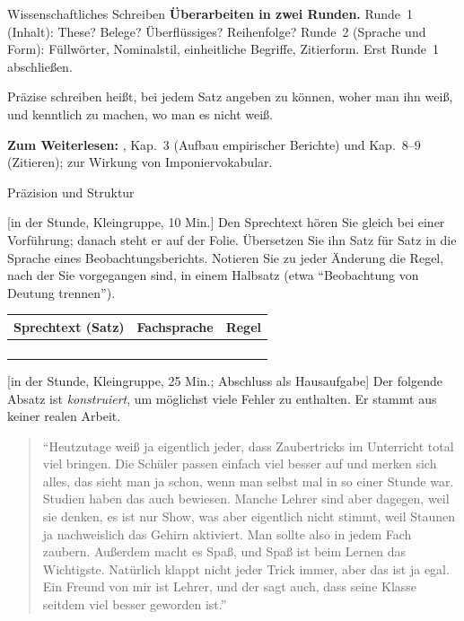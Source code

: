 \begin{handout}{Wissenschaftliches Schreiben}
\textbf{Überarbeiten in zwei Runden.} Runde~1 (Inhalt): These? Belege?
Überflüssiges? Reihenfolge? Runde~2 (Sprache und Form): Füllwörter,
Nominalstil, einheitliche Begriffe, Zitierform. Erst Runde~1 abschließen.

\begin{merkbox}
Präzise schreiben heißt, bei jedem Satz angeben zu können, woher man ihn
weiß, und kenntlich zu machen, wo man es nicht weiß.
\end{merkbox}

\textbf{Zum Weiterlesen:} \textcite{apa2020manual}, Kap.~3 (Aufbau
empirischer Berichte) und Kap.~8--9 (Zitieren);
\textcite{oppenheimer2006erudite} zur Wirkung von Imponiervokabular.
\end{handout}

\begin{uebungsblatt}{Präzision und Struktur}

[in der Stunde, Kleingruppe, 10 Min.]
Den Sprechtext hören Sie gleich bei einer Vorführung; danach steht er auf
der Folie. Übersetzen Sie ihn Satz für Satz in die Sprache eines
Beobachtungsberichts. Notieren Sie zu jeder Änderung die Regel, nach der
Sie vorgegangen sind, in einem Halbsatz (etwa \enquote{Beobachtung von
Deutung trennen}).

\begin{center}
\renewcommand{\arraystretch}{2.2}
\begin{tabular}{|p{}|p{}|p{}|}
\hline
\textbf{Sprechtext (Satz)} & \textbf{Fachsprache} & \textbf{Regel} \\
\hline
 & & \\ \hline
 & & \\ \hline
 & & \\ \hline
 & & \\ \hline
\end{tabular}
\end{center}

[in der Stunde, Kleingruppe, 25 Min.; Abschluss als Hausaufgabe]
Der folgende Absatz ist \emph{konstruiert}, um möglichst viele Fehler zu
enthalten. Er stammt aus keiner realen Arbeit.

\begin{quote}\small
\enquote{Heutzutage weiß ja eigentlich jeder, dass Zaubertricks im
Unterricht total viel bringen. Die Schüler passen einfach viel besser auf
und merken sich alles, das sieht man ja schon, wenn man selbst mal in so
einer Stunde war. Studien haben das auch bewiesen. Manche Lehrer sind aber
dagegen, weil sie denken, es ist nur Show, was aber eigentlich nicht
stimmt, weil Staunen ja nachweislich das Gehirn aktiviert. Man sollte also
in jedem Fach zaubern. Außerdem macht es Spaß, und Spaß ist beim Lernen
das Wichtigste. Natürlich klappt nicht jeder Trick immer, aber das ist ja
egal. Ein Freund von mir ist Lehrer, und der sagt auch, dass seine Klasse
seitdem viel besser geworden ist.}
\end{quote}


\end{uebungsblatt}
